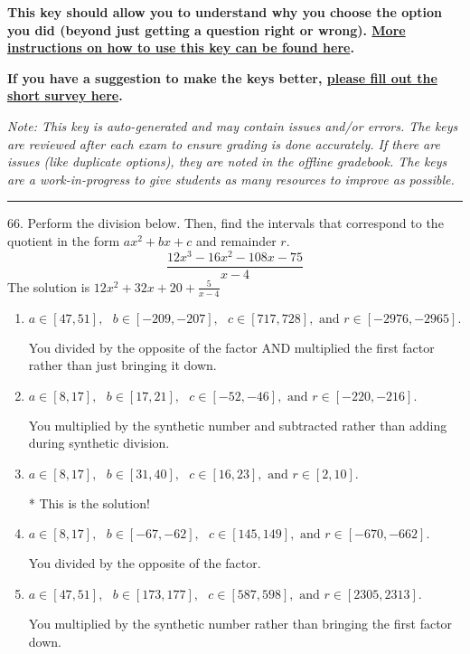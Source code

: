 \documentclass{extbook}[14pt]
\begin{document}
\textbf{This key should allow you to understand why you choose the option you did (beyond just getting a question right or wrong). \href{https://xronos.clas.ufl.edu/mac1105spring2020/courseDescriptionAndMisc/Exams/LearningFromResults}{More instructions on how to use this key can be found here}.}

\textbf{If you have a suggestion to make the keys better, \href{https://forms.gle/CZkbZmPbC9XALEE88}{please fill out the short survey here}.}

\textit{Note: This key is auto-generated and may contain issues and/or errors. The keys are reviewed after each exam to ensure grading is done accurately. If there are issues (like duplicate options), they are noted in the offline gradebook. The keys are a work-in-progress to give students as many resources to improve as possible.}

\rule{\textwidth}{0.4pt}

66. Perform the division below. Then, find the intervals that correspond to the quotient in the form $ax^2+bx+c$ and remainder $r$.
\[ \frac{12x^{3} -16 x^{2} -108 x -75}{x -4} \] 
The solution is $ 12x^{2} +32 x + 20 + \frac{5}{x -4} $ 

\begin{enumerate}[label=\Alph*.] 
\item $ a \in [47, 51], \text{   } b \in [-209, -207], \text{   } c \in [717, 728], \text{   and   } r \in [-2976, -2965]. $ 

  You divided by the opposite of the factor AND multiplied the first factor rather than just bringing it down. 
\item $ a \in [8, 17], \text{   } b \in [17, 21], \text{   } c \in [-52, -46], \text{   and   } r \in [-220, -216]. $ 

  You multiplied by the synthetic number and subtracted rather than adding during synthetic division. 
\item $ a \in [8, 17], \text{   } b \in [31, 40], \text{   } c \in [16, 23], \text{   and   } r \in [2, 10]. $ 

 * This is the solution! 
\item $ a \in [8, 17], \text{   } b \in [-67, -62], \text{   } c \in [145, 149], \text{   and   } r \in [-670, -662]. $ 

  You divided by the opposite of the factor. 
\item $ a \in [47, 51], \text{   } b \in [173, 177], \text{   } c \in [587, 598], \text{   and   } r \in [2305, 2313]. $ 

  You multiplied by the synthetic number rather than bringing the first factor down. 
\end{enumerate} 
 
\end{document}
